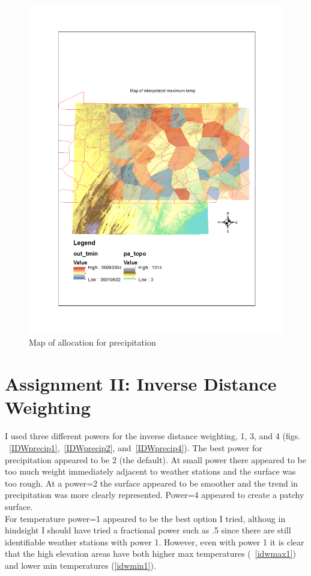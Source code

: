 \documentclass{article}\usepackage[]{graphicx}\usepackage[]{color}
\begin{document}
\begin{figure}
\includegraphics[scale=.9]{./figure/MinTemp}
\caption{Map of allocation for precipitation}
\label{allomin}
\end{figure}


\FloatBarrier

\section{Assignment II: Inverse Distance Weighting}
I used three different powers for the inverse distance weighting, 1, 3, and 4 (figs. ~\ref{IDWprecip1},~\ref{IDWprecip2}, and~\ref{IDWprecip4}).  The best power for precipitation appeared to be 2 (the default).  At small power there appeared to be too much weight immediately adjacent to weather stations and the surface was too rough.  At a power=2 the surface appeared to be smoother and the trend in precipitation was more clearly represented.  Power=4 appeared to create a patchy surface.\\
For temperature power=1 appeared to be the best option I tried, althoug in hindsight I should have tried a fractional power such as .5 since there are still identifiable weather stations with power 1.  However, even with power 1 it is clear that the high elevation areas have both higher max temperatures (~\ref{idwmax1}) and lower min temperatures (\ref{idwmin1}).\\
\end{document}
